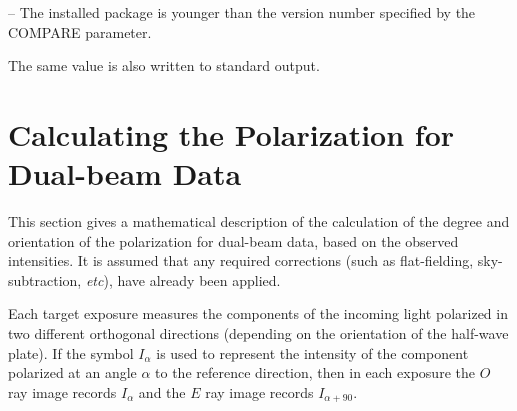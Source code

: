 \documentclass[twoside,11pt]{starlink}
\begin{document}
{{{{             -- The installed package is younger than the version number
            specified by the COMPARE parameter.

         }
         The same value is also written to standard output.
      }
   }
}

\newpage

\section{\label{APP:POL}Calculating the Polarization for Dual-beam Data}
This section gives a mathematical description of the calculation of the
degree and orientation of the polarization for dual-beam data, based on
the observed intensities. It is assumed that any required corrections
(such as flat-fielding, sky-subtraction, \emph{etc}), have already been
applied.

Each target exposure measures the components of the incoming light
polarized in two different orthogonal directions (depending on the
orientation of the half-wave plate). If the symbol $I_{\alpha}$ is used
to represent the intensity of the component polarized at an angle
$\alpha$ to the reference direction, then in each exposure the $O$ ray
image records $I_{\alpha}$ and the $E$ ray image records $I_{\alpha+90}$.
\end{document}
